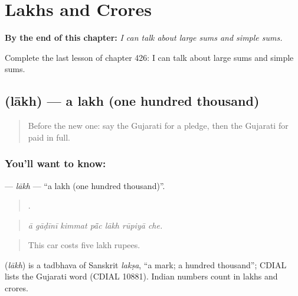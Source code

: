 
\chapter{Lakhs and Crores}
\label{ch:gu-lakhs-and-crores}

\begin{chapteropening}
\textbf{By the end of this chapter:} \emph{I can talk about large sums and simple sums.}

Complete the last lesson of chapter 426: I can talk about large sums and simple sums.
\end{chapteropening}

\section[\texorpdfstring{\gu{લાખ} (lākh)}{લાખ (lākh)}]{ (lākh) — a lakh (one hundred thousand)}

\label{lesson:GU-C426-lakh}



\begin{quote}
Before the new one: say the Gujarati for a pledge, then the Gujarati for paid in full.
\end{quote}

\subsection*{You'll want to know: }
\textbf{} — \emph{lākh} — \textquotedblleft{}a lakh (one hundred thousand)\textquotedblright{}.

\begin{quote}
      .
\end{quote}

\begin{quote}
\emph{ā gāḍīnī kimmat pā̃c lākh rūpiyā che.}
\end{quote}

\begin{quote}
This car costs five lakh rupees.
\end{quote}

\begin{cousinweb}
\textbf{} (\emph{lākh}) is a tadbhava of Sanskrit \emph{lakṣa}, \textquotedblleft{}a mark; a hundred thousand\textquotedblright{}; CDIAL lists the Gujarati word (CDIAL 10881). Indian numbers count in lakhs and crores.
\end{cousinweb}

